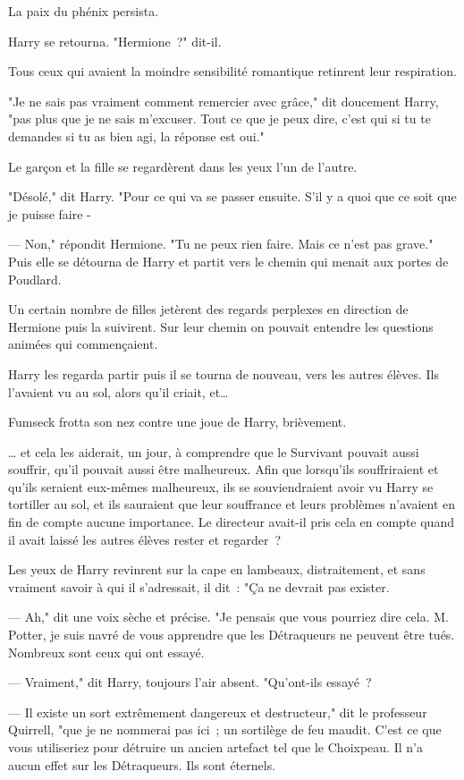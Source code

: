 La paix du phénix persista.

Harry se retourna. "Hermione~?" dit-il.

Tous ceux qui avaient la moindre sensibilité romantique retinrent leur respiration.

"Je ne sais pas vraiment comment remercier avec grâce," dit doucement Harry, "pas plus que je ne sais m'excuser. Tout ce que je peux dire, c'est qui si tu te demandes si tu as bien agi, la réponse est oui."

Le garçon et la fille se regardèrent dans les yeux l'un de l'autre.

"Désolé," dit Harry. "Pour ce qui va se passer ensuite. S'il y a quoi que ce soit que je puisse faire -

--- Non," répondit Hermione. "Tu ne peux rien faire. Mais ce n'est pas grave." Puis elle se détourna de Harry et partit vers le chemin qui menait aux portes de Poudlard.

Un certain nombre de filles jetèrent des regards perplexes en direction de Hermione puis la suivirent. Sur leur chemin on pouvait entendre les questions animées qui commençaient.

Harry les regarda partir puis il se tourna de nouveau, vers les autres élèves. Ils l'avaient vu au sol, alors qu'il criait, et…

Fumseck frotta son nez contre une joue de Harry, brièvement.

… et cela les aiderait, un jour, à comprendre que le Survivant pouvait aussi souffrir, qu'il pouvait aussi être malheureux. Afin que lorsqu'ils souffriraient et qu'ils seraient eux-mêmes malheureux, ils se souviendraient avoir vu Harry se tortiller au sol, et ils sauraient que leur souffrance et leurs problèmes n'avaient en fin de compte aucune importance. Le directeur avait-il pris cela en compte quand il avait laissé les autres élèves rester et regarder~?

Les yeux de Harry revinrent sur la cape en lambeaux, distraitement, et sans vraiment savoir à qui il s'adressait, il dit~: "Ça ne devrait pas exister.

--- Ah," dit une voix sèche et précise. "Je pensais que vous pourriez dire cela. M. Potter, je suis navré de vous apprendre que les Détraqueurs ne peuvent être tués. Nombreux sont ceux qui ont essayé.

--- Vraiment," dit Harry, toujours l'air absent. "Qu'ont-ils essayé~?

--- Il existe un sort extrêmement dangereux et destructeur," dit le professeur Quirrell, "que je ne nommerai pas ici~; un sortilège de feu maudit. C'est ce que vous utiliseriez pour détruire un ancien artefact tel que le Choixpeau. Il n'a aucun effet sur les Détraqueurs. Ils sont éternels.


